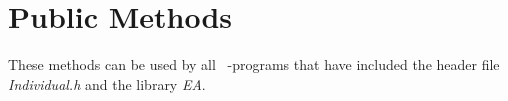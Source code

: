 \section{Public Methods}

These methods can be used by all \cpp\ -programs that have included
the header file {\em Individual.h} and the library {\em EA}.

\vspace*{4ex}


\vspace*{4ex}


\clearpage


\clearpage


\vspace*{4ex}


\clearpage


\clearpage






